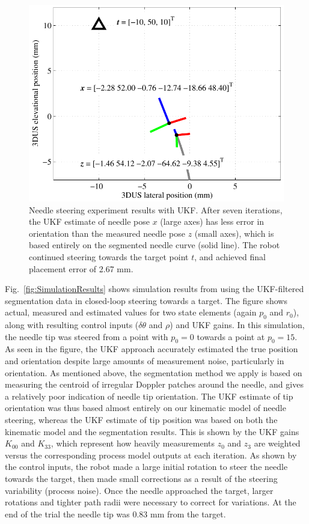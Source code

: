 \begin{figure}[!t]
\centering
\includegraphics[width=0.7\columnwidth]{Images/Chapter4/ExperimentalResults/ExperimentalResults}%
\caption[Needle steering experiment results with UKF]{Needle steering experiment results with UKF. After seven iterations, the UKF estimate of needle pose ${x}$ (large axes) has less error in orientation than the measured needle pose ${z}$ (small axes), which is based entirely on the segmented needle curve (solid line). The robot continued steering towards the target point ${t}$, and achieved final placement error of 2.67 mm.}
\label{fig:ExperimentalResults}
\end{figure}

Fig.~\ref{fig:SimulationResults} shows simulation results from using the UKF-filtered segmentation data in closed-loop steering towards a target. The figure shows actual, measured and estimated values for two state elements (again $p_0$ and $r_0$), along with resulting control inputs ($\delta\theta$ and $\rho$) and UKF gains. In this simulation, the needle tip was steered from a point with $p_0 = 0$ towards a point at $p_0 = 15$. As seen in the figure, the UKF approach accurately estimated the true position and orientation despite large amounts of measurement noise, particularly in orientation. As mentioned above, the segmentation method we apply is based on measuring the centroid of irregular Doppler patches around the needle, and gives a relatively poor indication of needle tip orientation. The UKF estimate of tip orientation was thus based almost entirely on our kinematic model of needle steering, whereas the UKF estimate of tip position was based on both the kinematic model and the segmentation results. This is shown by the UKF gains $K_{00}$ and $K_{33}$, which represent how heavily measurements $z_0$ and $z_3$ are weighted versus the corresponding process model outputs at each iteration. As shown by the control inputs, the robot made a large initial rotation to steer the needle towards the target, then made small corrections as a result of the steering variability (process noise). Once the needle approached the target, larger rotations and tighter path radii were necessary to correct for variations. At the end of the trial the needle tip was 0.83 mm from the target.    

